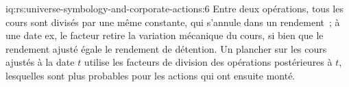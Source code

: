 \begin{solution}{iq:rs:universe-symbology-and-corporate-actions:6}
Entre deux opérations, tous les cours sont divisés par une même constante, qui s'annule dans un rendement~; à une date ex, le facteur retire la variation mécanique
du cours, si bien que le rendement ajusté égale le rendement de détention. Un plancher sur les cours ajustés à la date $t$ utilise les facteurs de division des
opérations postérieures à $t$, lesquelles sont plus probables pour les actions qui ont ensuite monté.
\end{solution}

